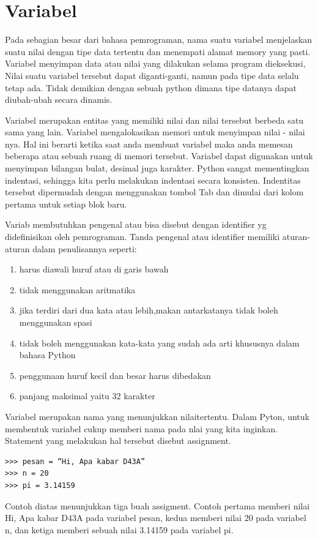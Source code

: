 
\section{Variabel}
Pada sebagian besar dari bahasa pemrograman, nama suatu variabel
menjelaskan suatu nilai dengan tipe data tertentu 
dan menempati alamat memory yang pasti.
Variabel menyimpan data atau nilai yang dilakukan selama program dieksekusi,
Nilai suatu variabel tersebut dapat diganti-ganti, namun pada tipe data selalu tetap ada.
Tidak demikian dengan sebuah python dimana tipe datanya dapat diubah-ubah
secara dinamis\cite{suparno2013komputasi}.

Variabel merupakan entitas yang memiliki nilai dan nilai tersebut berbeda satu sama yang lain. Variabel mengalokasikan memori untuk menyimpan nilai - nilai nya.
Hal ini berarti ketika saat anda membuat variabel maka anda memesan beberapa atau sebuah ruang di memori tersebut. 
Variabel dapat digunakan untuk menyimpan bilangan bulat, desimal juga karakter.
Python sangat mementingkan indentasi, sehingga kita perlu melakukan indentasi secara konsisten. 
Indentitas tersebut dipermudah dengan menggunakan tombol Tab dan dimulai dari kolom pertama untuk setiap blok baru.

Variab membutuhkan pengenal atau bisa disebut dengan identifier yg didefinisikan oleh pemrograman. Tanda pengenal atau identifier memiliki aturan-aturan dalam penulisannya seperti:
\begin{enumerate}
\item
harus diawali huruf atau di garis bawah
\item
tidak menggunakan aritmatika
\item
jika terdiri dari dua kata atau lebih,makan antarkatanya tidak boleh menggunakan spasi
\item
tidak boleh menggunakan kata-kata yang sudah ada arti khususnya dalam bahasa Python
\item
penggunaan huruf kecil dan besar harus dibedakan
\item
panjang maksimal yaitu 32 karakter
\end{enumerate}

Variabel merupakan nama yang menunjukkan nilaitertentu. Dalam Pyton, untuk membentuk variabel cukup memberi nama pada nlai yang kita inginkan. Statement yang melakukan hal tersebut disebut assignment.
\begin{verbatim}
>>> pesan = “Hi, Apa kabar D43A”
>>> n = 20
>>> pi = 3.14159
\end{verbatim}
Contoh diatas menunjukkan tiga buah assigment. Contoh pertama memberi nilai \“Hi, Apa kabar D43A\” pada variabel pesan, kedua memberi nilai 20 pada variabel n, dan ketiga memberi sebuah nilai 3.14159 pada variabel pi.\cite{utami2004logika}

